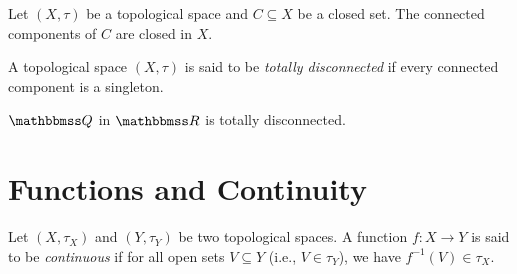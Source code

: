 \documentclass[screen,single]{techreport}
\numberwithin{equation}{section}
\begin{document}
\begin{proposition}\label{Prop:ClosedConnComponentStillClosed}
	Let $(X,\tau)$ be a topological space and $C \subseteq X$ be a closed set.
	The connected components of $C$ are closed in $X$.
\end{proposition}

\begin{definition}\label{De:TotalDisconnectedness}
	A topological space $(X,\tau)$ is said to be \emph{totally disconnected} if every connected component is a singleton.
\end{definition}

\begin{example}\label{De:QInRIsTotallyDisconn}
	$\bbQ$ in $\bbR$ is totally disconnected.
\end{example}

\section{Functions and Continuity}

\begin{definition}\label{De:ContinuousFunctions}
	Let $(X,\tau_X)$ and $(Y,\tau_Y)$ be two topological spaces.
	A function $f : X \to Y$ is said to be \emph{continuous} if for all open sets $V \subseteq Y$ (i.e., $V \in \tau_Y$), we have $f^{-1}(V) \in \tau_X$.
\end{definition}
\end{document}
